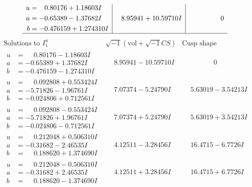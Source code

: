 \documentclass[1p]{elsarticle_modified}
\theoremstyle{definition}
\newcommand{\I}{\sqrt{-1}}
\begin{document}
$$\begin{array}{c|c|c}
\begin{aligned}
u &= \phantom{-}0.80176 + 1.18603 I \\
a &= -0.65389 - 1.37682 I \\
b &= -0.476159 + 1.274310 I\end{aligned}
 & \phantom{-}8.95941 + 10.59710 I & \phantom{-0.000000 } 0\\
 \hline 
 \end{array}$$\newpage$$\begin{array}{c|c|c}  
\text{Solutions to }I^u_{1}& \I (\text{vol} + \sqrt{-1}CS) & \text{Cusp shape}\\
 \hline 
\begin{aligned}
u &= \phantom{-}0.80176 - 1.18603 I \\
a &= -0.65389 + 1.37682 I \\
b &= -0.476159 - 1.274310 I\end{aligned}
 & \phantom{-}8.95941 - 10.59710 I & \phantom{-0.000000 } 0 \\ \hline\begin{aligned}
u &= \phantom{-}0.092808 + 0.553424 I \\
a &= -5.71826 - 1.96761 I \\
b &= -0.024806 + 0.712561 I\end{aligned}
 & \phantom{-}7.07374 - 5.24790 I & \phantom{-}5.63019 - 3.54213 I \\ \hline\begin{aligned}
u &= \phantom{-}0.092808 - 0.553424 I \\
a &= -5.71826 + 1.96761 I \\
b &= -0.024806 - 0.712561 I\end{aligned}
 & \phantom{-}7.07374 + 5.24790 I & \phantom{-}5.63019 + 3.54213 I \\ \hline\begin{aligned}
u &= \phantom{-}0.212048 + 0.506310 I \\
a &= -0.31682 - 2.46535 I \\
b &= \phantom{-}0.188620 + 1.374690 I\end{aligned}
 & \phantom{-}4.12511 - 3.28456 I & \phantom{-}16.4715 - 6.7726 I \\ \hline\begin{aligned}
u &= \phantom{-}0.212048 - 0.506310 I \\
a &= -0.31682 + 2.46535 I \\
b &= \phantom{-}0.188620 - 1.374690 I\end{aligned}
 & \phantom{-}4.12511 + 3.28456 I & \phantom{-}16.4715 + 6.7726 I \\ \hline\begin{aligned}

\end{aligned}
\end{array}$$
\end{document}
